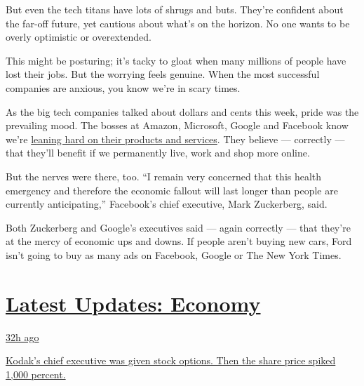 But even the tech titans have lots of shrugs and buts. They're confident
about the far-off future, yet cautious about what's on the horizon. No
one wants to be overly optimistic or overextended.

This might be posturing; it's tacky to gloat when many millions of
people have lost their jobs. But the worrying feels genuine. When the
most successful companies are anxious, you know we're in scary times.

As the big tech companies talked about dollars and cents this week,
pride was the prevailing mood. The bosses at Amazon, Microsoft, Google
and Facebook know we're
\href{https://www.nytimes3xbfgragh.onion/2020/04/30/technology/coronavirus-quarantine-technology.html}{leaning
hard on their products and services}. They believe --- correctly ---
that they'll benefit if we permanently live, work and shop more online.

But the nerves were there, too. ``I remain very concerned that this
health emergency and therefore the economic fallout will last longer
than people are currently anticipating,'' Facebook's chief executive,
Mark Zuckerberg, said.

Both Zuckerberg and Google's executives said --- again correctly ---
that they're at the mercy of economic ups and downs. If people aren't
buying new cars, Ford isn't going to buy as many ads on Facebook, Google
or The New York Times.

\hypertarget{latest-updates-economy}{%
\section{\texorpdfstring{\href{https://www.nytimes3xbfgragh.onion/live/2020/07/31/business/stock-market-today-coronavirus?action=click\&pgtype=Article\&state=default\&region=MAIN_CONTENT_1\&context=storylines_live_updates}{Latest
Updates:
Economy}}{Latest Updates: Economy}}\label{latest-updates-economy}}

\href{https://www.nytimes3xbfgragh.onion/live/2020/07/31/business/stock-market-today-coronavirus?action=click\&pgtype=Article\&state=default\&region=MAIN_CONTENT_1\&context=storylines_live_updates\#kodaks-chief-executive-was-given-stock-options-then-the-share-price-spiked-1000-percent}{32h
ago}

\href{https://www.nytimes3xbfgragh.onion/live/2020/07/31/business/stock-market-today-coronavirus?action=click\&pgtype=Article\&state=default\&region=MAIN_CONTENT_1\&context=storylines_live_updates\#kodaks-chief-executive-was-given-stock-options-then-the-share-price-spiked-1000-percent}{Kodak's
chief executive was given stock options. Then the share price spiked
1,000 percent.}

